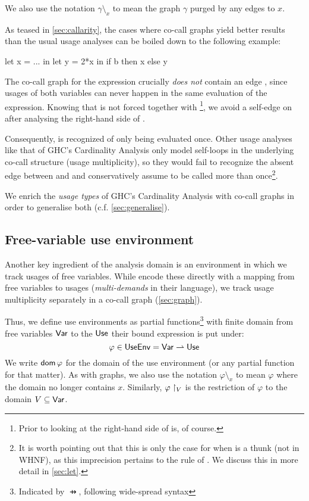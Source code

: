 We also use the notation $\gamma \setminus_x$ to mean the graph $\gamma$ purged by any edges to $x$.

As teased in \ref{sec:callarity}, the cases where co-call graphs yield better results than the usual usage analyses can be boiled down to the following example:

\begin{haskellcode}
let x = ...
in let y = 2*x
   in if b 
      then x 
      else y
\end{haskellcode}

The co-call graph for the  expression crucially \emph{does not} contain an edge , since usages of both variables can never happen in the same evaluation of the expression.
Knowing that  is not forced together with \footnote{Prior to looking at the right-hand side of  is, of course.}, we avoid a self-edge on  after analysing the right-hand side of .

Consequently,  is recognized of only being evaluated once. 
Other usage analyses like that of GHC's Cardinality Analysis \parencite{card} only model self-loops in the underlying co-call structure (\eg usage multiplicity), so they would fail to recognize the absent edge between  and  and conservatively assume  to be called more than once\footnote{It is worth pointing out that this is only the case for when  is a thunk (\eg not in WHNF), as this imprecision pertains to the  rule of \textcite{card}. 
We discuss this in more detail in \cref{sec:let}.}.

We enrich the \emph{usage types} of GHC's Cardinality Analysis \parencite{card} with co-call graphs in order to generalise both (c.f. \cref{sec:generalise}).

\subsection{Free-variable use environment}\label{sec:useenv}

Another key ingredient of the analysis domain is an environment in which we track usages of free variables.
While \textcite{card} encode these directly with a mapping from free variables to usages (\emph{multi-demands} in their language), we track usage multiplicity separately in a co-call graph (\cref{sec:graph}).

Thus, we define use environments as partial functions\footnote{Indicated by $\pfun$, following wide-spread syntax} with finite domain from free variables $\text{\textsf{Var}}$ to the $\text{\textsf{Use}}$ their bound expression is put under:
\[
\varphi \in \text{\textsf{UseEnv}} = \text{\textsf{Var}} \rightharpoonup \text{\textsf{Use}}
\]
We write $\mathsf{dom}\,\varphi$ for the domain of the use environment (or any partial function for that matter).
As with graphs, we also use the notation $\varphi \setminus_x$ to mean $\varphi$ where the domain no longer contains $x$.
Similarly, $\varphi\restriction_{V}$ is the restriction of $\varphi$ to the domain $V \subseteq \text{\textsf{Var}}$.

